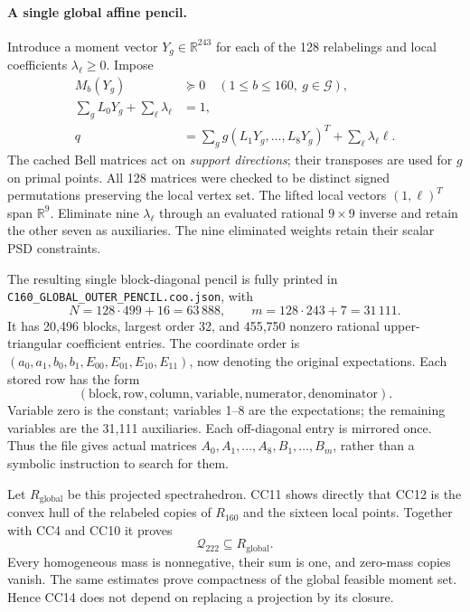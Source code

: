 \paragraph{A single global affine pencil.}
Introduce a moment vector $Y_g\in\mathbb R^{243}$ for each of the
128 relabelings and local coefficients $\lambda_\ell\ge0$.  Impose
\[
\begin{split}
 M_b(Y_g)&\succeq0\quad(1\le b\le160,\ g\in\mathcal G),\\
 \sum_gL_0Y_g+\sum_\ell\lambda_\ell&=1,\\
 q&=\sum_g g(L_1Y_g,\ldots,L_8Y_g)^T
       +\sum_\ell\lambda_\ell\ell.
\end{split}\tag{CC12}
\]
The cached Bell matrices act on \emph{support directions}; their
transposes are used for $g$ on primal points.  All 128 matrices were
checked to be distinct signed permutations preserving the local
vertex set.  The lifted local vectors $(1,\ell)^T$ span
$\mathbb R^9$.  Eliminate nine $\lambda_\ell$ through an evaluated
rational $9\times9$ inverse and retain the other seven as auxiliaries.
The nine eliminated weights retain their scalar PSD constraints.

The resulting single block-diagonal pencil is fully printed in
\nolinkurl{C160_GLOBAL_OUTER_PENCIL.coo.json}, with
\[
 \boxed{N=128\cdot499+16=63\,888,\qquad
        m=128\cdot243+7=31\,111.}
\tag{CC13}
\]
It has 20,496 blocks, largest order 32, and 455,750 nonzero rational
upper-triangular coefficient entries.  The coordinate order is
$(a_0,a_1,b_0,b_1,E_{00},E_{01},E_{10},E_{11})$, now denoting the
original expectations.  Each stored row has the form
\[
 (\text{block},\text{row},\text{column},\text{variable},
   \text{numerator},\text{denominator}).
\]
Variable zero is the constant; variables 1--8 are the expectations;
the remaining variables are the 31,111 auxiliaries.  Each off-diagonal
entry is mirrored once.  Thus the file gives actual matrices
$A_0,A_1,\ldots,A_8,B_1,\ldots,B_m$, rather than a symbolic
instruction to search for them.

Let $R_{\mathrm{global}}$ be this projected spectrahedron.  CC11
shows directly that CC12 is the convex hull of the relabeled copies
of $R_{160}$ and the sixteen local points.  Together with CC4 and
CC10 it proves
\[
 \boxed{\mathcal Q_{222}\subseteq R_{\mathrm{global}}.}
\tag{CC14}
\]
Every homogeneous mass is nonnegative, their sum is one, and
zero-mass copies vanish.  The same estimates prove compactness of
the global feasible moment set.  Hence CC14 does not depend on
replacing a projection by its closure.

